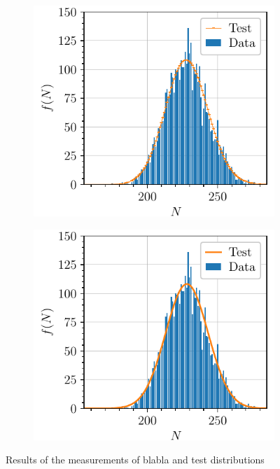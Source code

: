 \begin{figure}[htbp]
\begin{subfigure}{0.495\textwidth}
        \caption{}
    \end{subfigure}
    \begin{subfigure}{0.495\textwidth}
        \includegraphics[scale=1]{figures/highmean_poisson.pdf}
        \caption{}
    \end{subfigure}
    \hfill
    \begin{subfigure}{0.495\textwidth}
        \includegraphics[scale=1]{figures/highmean_gaussian.pdf}
        \caption{}
    \end{subfigure}
    \caption{Results of the measurements of blabla and test distributions}
    \label{fig:statistical_tests}
\end{figure}

